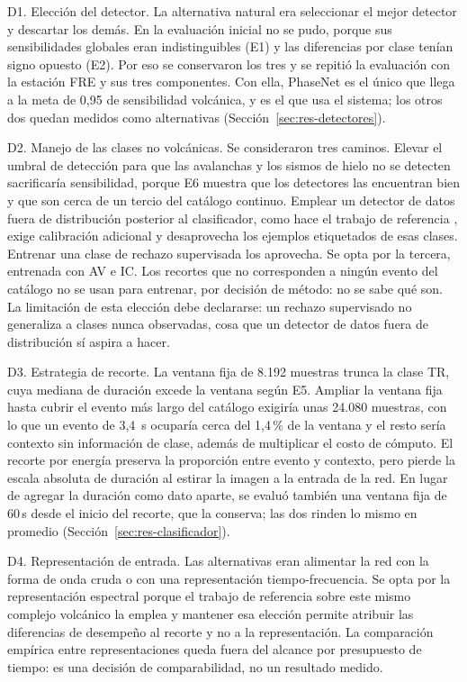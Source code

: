 D1. Elección del detector. La alternativa natural era seleccionar el mejor
detector y descartar los demás. En la evaluación inicial no se pudo, porque
sus sensibilidades globales eran indistinguibles (E1) y las diferencias por
clase tenían signo opuesto (E2). Por eso se conservaron los tres y se
repitió la evaluación con la estación FRE y sus tres componentes. Con ella,
PhaseNet es el único que llega a la meta de 0,95 de sensibilidad volcánica, y
es el que usa el sistema; los otros dos quedan medidos como alternativas
(Sección~\ref{sec:res-detectores}).

D2. Manejo de las clases no volcánicas. Se consideraron tres caminos.
Elevar el umbral de detección para que las avalanchas y los sismos de hielo no
se detecten sacrificaría sensibilidad, porque E6 muestra que los detectores
las encuentran bien y que son cerca de un tercio del catálogo continuo. Emplear
un detector de datos fuera de distribución posterior al clasificador, como hace
el trabajo de referencia \parencite{espinosacurilem2025ood}, exige calibración
adicional y desaprovecha los ejemplos etiquetados de esas clases. Entrenar una
clase de rechazo supervisada los aprovecha. Se opta por la tercera, entrenada
con AV e IC. Los recortes que no corresponden a ningún evento del catálogo no
se usan para entrenar, por decisión de método: no se sabe qué son. La
limitación de esta elección debe declararse: un rechazo supervisado no
generaliza a clases nunca observadas, cosa que un detector de datos fuera de
distribución sí aspira a hacer.

D3. Estrategia de recorte. La ventana fija de 8.192 muestras trunca la
clase TR, cuya mediana de duración excede la ventana según E5. Ampliar la ventana
fija hasta cubrir el evento más largo del catálogo exigiría unas 24.080 muestras,
con lo que un evento de 3,4~s ocuparía cerca del 1,4\,\% de la ventana y el resto
sería contexto sin información de clase, además de multiplicar el costo de
cómputo. El recorte por energía preserva la proporción entre evento y contexto,
pero pierde la escala absoluta de duración al estirar la imagen a la entrada de
la red. En lugar de agregar la duración como dato aparte, se evaluó también una
ventana fija de 60\,s desde el inicio del recorte, que la conserva; las dos
rinden lo mismo en promedio (Sección~\ref{sec:res-clasificador}).

D4. Representación de entrada. Las alternativas eran alimentar la red
con la forma de onda cruda o con una representación tiempo-frecuencia. Se opta
por la representación espectral porque el trabajo de referencia sobre este mismo
complejo volcánico la emplea \parencite{espinosacurilem2026segmentacion} y mantener esa elección permite atribuir las diferencias de desempeño al recorte
y no a la representación. La comparación empírica entre representaciones queda
fuera del alcance por presupuesto de tiempo: es una decisión de
comparabilidad, no un resultado medido.

